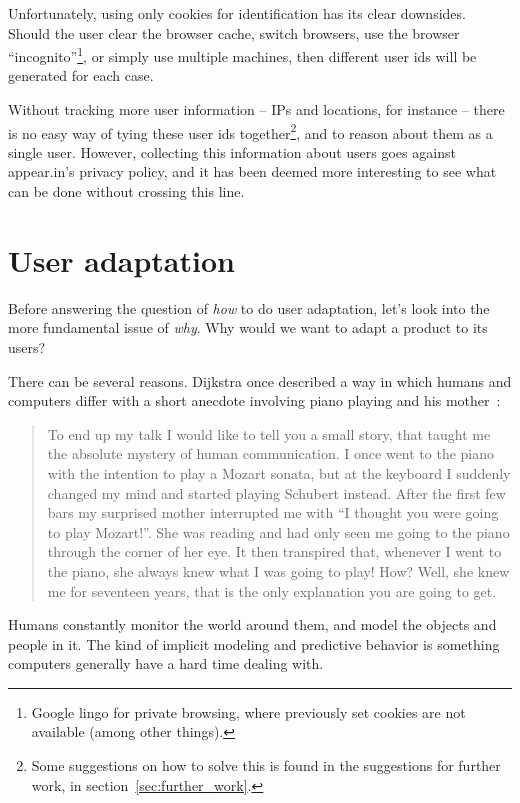 Unfortunately, using only cookies for identification has its clear downsides. Should the user clear the browser cache, switch browsers, use the browser ``incognito''\footnote{Google lingo for private browsing, where previously set cookies are not available (among other things).}, or simply use multiple machines, then different user ids will be generated for each case.

Without tracking more user information -- IPs and locations, for instance -- there is no easy way of tying these user ids together\footnote{Some suggestions on how to solve this is found in the suggestions for further work, in section~\ref{sec:further_work}.}, and to reason about them as a single user. However, collecting this information about users goes against appear.in's privacy policy, and it has been deemed more interesting to see what can be done without crossing this line.

\section{User adaptation}
\label{intro:sec:adaptation}

Before answering the question of \emph{how} to do user adaptation, let's look into the more fundamental issue of \emph{why}. Why would we want to adapt a product to its users?

There can be several reasons. Dijkstra once described a way in which humans and computers differ with a short anecdote involving piano playing and his mother~\cite{Dijkstra1982}:

\begin{quote}
    To end up my talk I would like to tell you a small story, that taught me the absolute mystery of human communication. I once went to the piano with the intention to play a Mozart sonata, but at the keyboard I suddenly changed my mind and started playing Schubert instead. After the first few bars my surprised mother interrupted me with ``I thought you were going to play Mozart!''. She was reading and had only seen me going to the piano through the corner of her eye. It then transpired that, whenever I went to the piano, she always knew what I was going to play! How? Well, she knew me for seventeen years, that is the only explanation you are going to get.
\end{quote}

Humans constantly monitor the world around them, and model the objects and people in it. The kind of implicit modeling and predictive behavior is something computers generally have a hard time dealing with.

